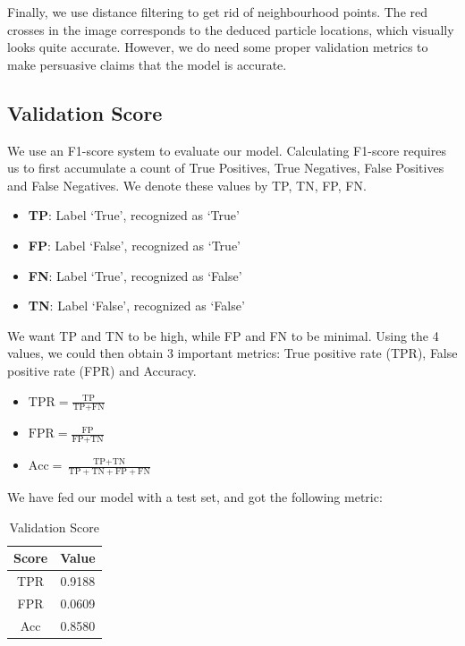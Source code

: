\documentclass[11pt,a4paper]{scrartcl}
\begin{document}
Finally, we use distance filtering to get rid of neighbourhood points. The red crosses in the image corresponds to the deduced particle locations, which visually looks quite accurate. However, we do need some proper validation metrics to make persuasive claims that the model is accurate.

\subsection{Validation Score} 
We use an F1-score system to evaluate our model. Calculating F1-score requires us to first accumulate a count of True Positives, True Negatives, False Positives and False Negatives. We denote these values by TP, TN, FP, FN.

\begin{itemize}
    \item \textbf{TP}: Label `True', recognized as `True'
    \item \textbf{FP}: Label `False', recognized as `True'
    \item \textbf{FN}: Label `True', recognized as `False'
    \item \textbf{TN}: Label `False', recognized as `False' 
\end{itemize}

We want TP and TN to be high, while FP and FN to be minimal. Using the 4 values, we could then obtain 3 important metrics: True positive rate (TPR), False positive rate (FPR) and Accuracy.

\begin{itemize}
    \item $\text{TPR} = \frac{\text{TP}}{\text{TP} + \text{FN}}$
    \item $\text{FPR} = \frac{\text{FP}}{\text{FP} + \text{TN}}$
    \item $\text{Acc} = \frac{\text{TP} + \text{TN}}{\text{TP} + \text{TN} + \text{FP} + \text{FN}}$
\end{itemize}

We have fed our model with a test set, and got the following metric:

\begin{table}[h]
    \centering
    \begin{tabular}{cc}
        \toprule
        \textbf{Score} & \textbf{Value}  \\
        \midrule
        TPR &0.9188 \\
        FPR & 0.0609 \\
        Acc & 0.8580\\
        \bottomrule
    \end{tabular}
    \caption{Validation Score}
\end{table}
\end{document}
